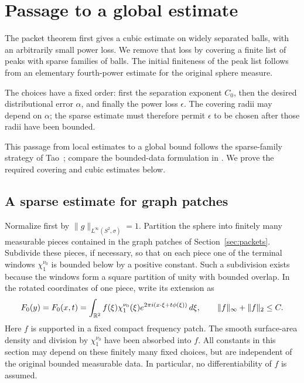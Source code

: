 \section{Passage to a global estimate}\label{sec:global}

The packet theorem first gives a cubic estimate on widely separated
balls, with an arbitrarily small power loss.  We remove that loss by
covering a finite list of peaks with sparse families of balls.  The
initial finiteness of the peak list follows from an elementary
fourth-power estimate for the original sphere measure.

The choices have a fixed order: first the separation exponent \(C_0\),
then the desired distributional error \(\alpha\), and finally the
power loss \(\epsilon\).  The covering radii may depend on \(\alpha\);
the sparse estimate must therefore permit \(\epsilon\) to be chosen
after those radii have been bounded.

This passage from local estimates to a global bound follows the
sparse-family strategy of Tao~\cite{Tao1999Epsilon}; compare the
bounded-data formulation in
\cite[arXiv:1012.3760v3, Appendix, Lemmas~A1--A2]{BourgainGuth2011}.
We prove the required covering and cubic estimates below.

\subsection{A sparse estimate for graph patches}

Normalize first by $\|g\|_{L^\infty(S^2,\sigma)}=1$. Partition the
sphere into finitely many measurable pieces contained in the graph patches
of Section~\ref{sec:packets}. Subdivide these pieces, if necessary, so
that on each piece one of the terminal windows $\chi_1^{\nu_0}$ is
bounded below by a positive constant. Such a subdivision exists because
the windows form a square partition of unity with bounded overlap.
In the rotated coordinates of one piece, write its extension as
\begin{equation}\label{glob:patch-extension}
 F_0(y)=F_0(x,t)
 =\int_{\mathbb R^2}f(\xi)\chi_1^{\nu_0}(\xi)
       e^{2\pi i(x\cdot\xi+t\phi(\xi))}\,d\xi,
 \qquad \|f\|_\infty+\|f\|_2\le C.
\end{equation}
Here $f$ is supported in a fixed compact frequency patch. The smooth
surface-area density and division by $\chi_1^{\nu_0}$ have been absorbed
into $f$. All constants in this section may depend on these finitely many
fixed choices, but are independent of the original bounded measurable
data. In particular, no differentiability of $f$ is assumed.

